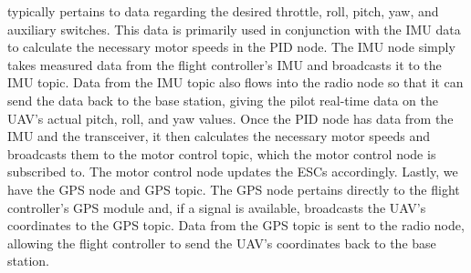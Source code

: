 \documentclass[english]{upeeei}
\begin{document}
typically pertains to data regarding the desired throttle, roll, pitch, yaw, and auxiliary switches. This data is primarily used in conjunction
with the IMU data to calculate the necessary motor speeds in the PID node. The IMU node simply takes measured data from the flight controller's
IMU and broadcasts it to the IMU topic. Data from the IMU topic also flows into the radio node so that it can send the data back to the base
station, giving the pilot real-time data on the UAV's actual pitch, roll, and yaw values. Once the PID node has data from the IMU and the
transceiver, it then calculates the necessary motor speeds and broadcasts them to the motor control topic, which the motor control node is 
subscribed to. The motor control node updates the ESCs accordingly. Lastly, we have the GPS node and GPS topic. The GPS node pertains directly
to the flight controller's GPS module and, if a signal is available, broadcasts the UAV's coordinates to the GPS topic. Data from the GPS topic
is sent to the radio node, allowing the flight controller to send the UAV's coordinates back to the base station.
\end{document}

